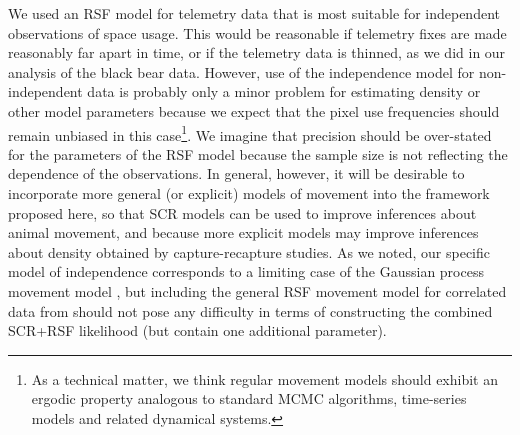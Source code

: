 We used an RSF model for telemetry data that is most suitable for
independent observations of space usage.  This would be reasonable if
telemetry fixes are made reasonably far apart in time, or if the
telemetry data 
is thinned, as we did in our analysis of the
black bear data.  However, use of the independence model for
non-independent data is probably only a minor problem for estimating
density or other model parameters because we expect that the pixel use
frequencies should remain unbiased in this case\footnote{As a
  technical matter, we think regular movement models should exhibit an
  ergodic property analogous to standard MCMC algorithms, time-series
  models and related dynamical systems.}.  We imagine that precision
should be over-stated for the parameters of the RSF model because the
sample size is not reflecting the dependence of the observations.  In
general, however, it will be desirable to incorporate more general (or
explicit) models of movement into the framework proposed here, so that
SCR models can be used to improve inferences about animal movement,
and because more explicit models may improve inferences about density
obtained by capture-recapture studies.  As we noted, our specific model
of independence corresponds to a limiting case of the Gaussian process
movement model \citep{johnson_etal:2008}, but including the general
RSF movement model for correlated data from \citet{johnson_etal:2008}
should not pose any difficulty in terms of constructing the combined
SCR+RSF likelihood (but contain one additional parameter).

































